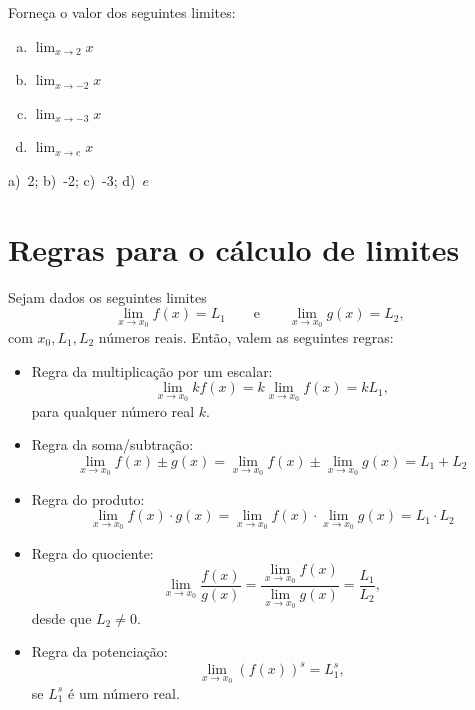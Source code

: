 \begin{exer}
  Forneça o valor dos seguintes limites:
  \begin{enumerate}[a)]
  \item $\displaystyle \lim_{x\to 2} x$
  \item $\displaystyle \lim_{x\to -2} x$
  \item $\displaystyle \lim_{x\to -3} x$
  \item $\displaystyle \lim_{x\to e} x$
  \end{enumerate}
\end{exer}
\begin{resp}
  a)~2; b)~-2; c)~-3; d)~$e$
\end{resp}

\section{Regras para o cálculo de limites}\label{cap_lim_sec_regras}

Sejam dados os seguintes limites
\begin{equation}
  \lim_{x\to x_0} f(x) = L_1\qquad\text{e}\qquad \lim_{x\to x_0} g(x) = L_2,
\end{equation}
com $x_0, L_1, L_2$ números reais. Então, valem as seguintes regras:
\begin{itemize}
\item Regra da multiplicação por um escalar:
  \begin{equation}
    \lim_{x\to x_0} kf(x) = k\lim_{x\to x_0} f(x) = kL_1,
  \end{equation}
  para qualquer número real $k$.
\item Regra da soma/subtração:
  \begin{equation}
    \lim_{x\to x_0} f(x) \pm g(x) = \lim_{x\to x_0} f(x) \pm \lim_{x\to x_0} g(x) = L_1 + L_2
  \end{equation}
\item Regra do produto:
  \begin{equation}
    \lim_{x\to x_0} f(x) \cdot g(x) = \lim_{x\to x_0} f(x) \cdot \lim_{x\to x_0} g(x) = L_1 \cdot L_2
  \end{equation}
\item Regra do quociente:
  \begin{equation}
    \lim_{x\to x_0} \frac{f(x)}{g(x)} = \frac{\lim_{x\to x_0} f(x)}{\lim_{x\to x_0} g(x)} = \frac{L_1}{L_2},
  \end{equation}
  desde que $L_2\neq 0$.
\item Regra da potenciação:
  \begin{equation}
    \lim_{x\to x_0} (f(x))^s = L_1^s,
  \end{equation}
  se $L_1^s$ é um número real.
\end{itemize}

